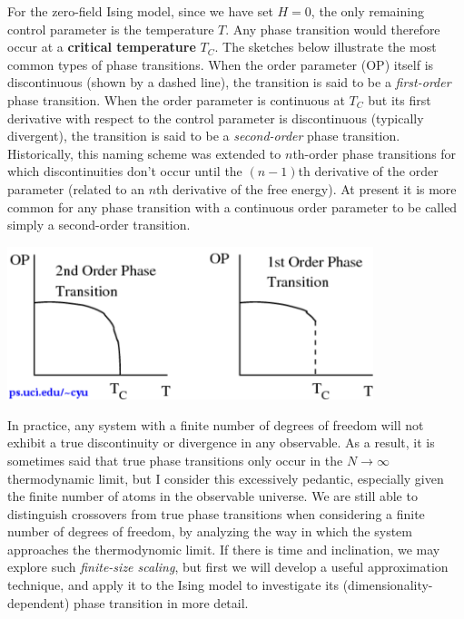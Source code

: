 For the zero-field Ising model, since we have set $H = 0$, the only remaining control parameter is the temperature $T$.
Any phase transition would therefore occur at a \textbf{critical temperature} $T_C$.
The sketches below illustrate the most common types of phase transitions.
When the order parameter (OP) itself is discontinuous (shown by a dashed line), the transition is said to be a \textit{first-order} phase transition. %
When the order parameter is continuous at $T_C$ but its first derivative with respect to the control parameter is discontinuous (typically divergent), the transition is said to be a \textit{second-order} phase transition.
Historically, this naming scheme was extended to $n$th-order phase transitions for which discontinuities don't occur until the $(n-1)$th derivative of the order parameter (related to an $n$th derivative of the free energy).
At present it is more common for any phase transition with a continuous order parameter to be called simply a second-order transition.

\begin{center}\includegraphics[width=0.8\textwidth]{figs/unit09_transitions.pdf}\end{center}

In practice, any system with a finite number of degrees of freedom will not exhibit a true discontinuity or divergence in any observable.
As a result, it is sometimes said that true phase transitions only occur in the $N \to \infty$ thermodynamic limit, but I consider this excessively pedantic, especially given the finite number of atoms in the observable universe.
We are still able to distinguish crossovers from true phase transitions when considering a finite number of degrees of freedom, by analyzing the way in which the system approaches the thermodynomic limit.
If there is time and inclination, we may explore such \textit{finite-size scaling}, but first we will develop a useful approximation technique, and apply it to the Ising model to investigate its (dimensionality-dependent) phase transition in more detail.



